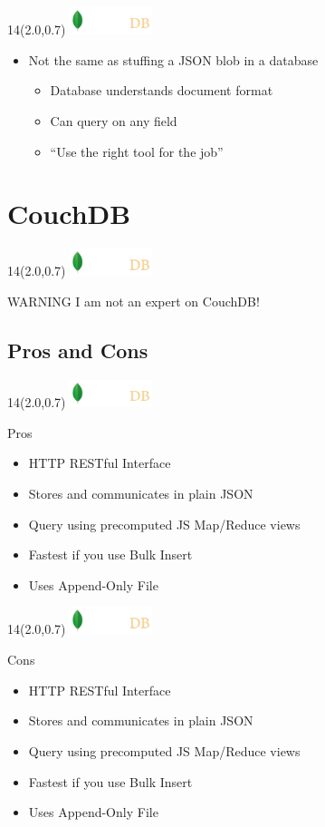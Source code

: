 \documentclass{beamer}
\newcommand{\MongoLogo}{
\begin{textblock}{14}(2.0,0.7)
  \includegraphics[height=0.8cm]{logo-mongodb-ondark.png}
\end{textblock}
}
\begin{document}
\begin{frame}
  \MongoLogo

  \begin{itemize}
    \item Not the same as stuffing a JSON blob in a database
    \begin{itemize}
      \item Database understands document format
      \item Can query on any field
      \item ``Use the right tool for the job''
    \end{itemize}
  \end{itemize}
\end{frame}

\section{CouchDB}
\begin{frame}[fragile]
  \MongoLogo

  \begin{block} {\color{red}WARNING}
    I am not an expert on CouchDB!
  \end{block}
\end{frame}

\subsection{Pros and Cons}
\begin{frame}[fragile]
  \MongoLogo

  \begin{block} {Pros}
    \begin{itemize}
      \item HTTP RESTful Interface
      \item Stores and communicates in plain JSON
      \item Query using precomputed JS Map/Reduce views
      \item Fastest if you use Bulk Insert
      \item Uses Append-Only File
    \end{itemize}
  \end{block}
\end{frame}

\begin{frame}[fragile]
  \MongoLogo

  \begin{block} {Cons}
    \begin{itemize}
      \item HTTP RESTful Interface
      \item Stores and communicates in plain JSON
      \item Query using precomputed JS Map/Reduce views
      \item Fastest if you use Bulk Insert
      \item Uses Append-Only File
    \end{itemize}
  \end{block}
\end{frame}
\end{document}
